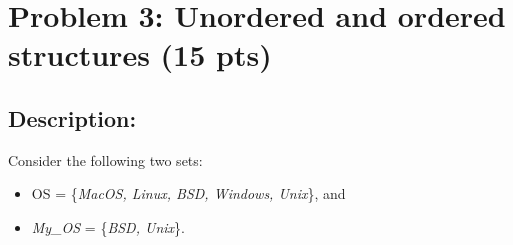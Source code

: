 \section{Problem 3: Unordered and ordered structures (15 pts)}

\subsection{Description:}

\noindent Consider the following two sets:\
\begin{itemize}
  \item OS = \{\emph{MacOS, Linux, BSD, Windows, Unix}\}, and
  \item \emph{My\_OS} = \{\emph{BSD, Unix}\}.
\end{itemize}


